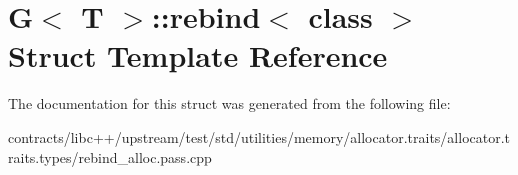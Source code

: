 \hypertarget{struct_g_1_1rebind}{}\section{G$<$ T $>$\+:\+:rebind$<$ class $>$ Struct Template Reference}
\label{struct_g_1_1rebind}


The documentation for this struct was generated from the following file\+:\begin{DoxyCompactItemize}
\item 
contracts/libc++/upstream/test/std/utilities/memory/allocator.\+traits/allocator.\+traits.\+types/rebind\+\_\+alloc.\+pass.\+cpp\end{DoxyCompactItemize}
